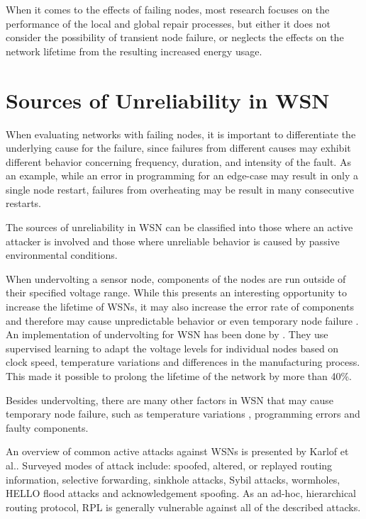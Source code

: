 When it comes to the effects of failing nodes, most research focuses on the performance of the local and global repair processes, but either it does not consider the possibility of transient node failure, or neglects the effects on the network lifetime from the resulting increased energy usage.

\section{Sources of Unreliability in WSN}

When evaluating networks with failing nodes, it is important to differentiate
the underlying cause for the failure, since failures from different causes may
exhibit different behavior concerning frequency, duration, and intensity of the
fault. As an example, while an error in programming for an edge-case may result
in only a single node restart, failures from overheating may be result in many
consecutive restarts. \cite{boano2013hot,boano2010impact}

The sources of unreliability in \ac{WSN} can be classified into those where an active attacker is involved and those where unreliable behavior is caused by passive environmental conditions.

When undervolting a sensor node, components of the nodes are run outside of their specified voltage range.
While this presents an interesting opportunity to increase the lifetime of \acp{WSN}, it may also increase the error rate of components and therefore may cause unpredictable behavior or even temporary node failure \cite{kulau2015undervolting}.
An implementation of undervolting for \ac{WSN} has been done by \cite{kulau2016idealvolting}.
They use supervised learning to adapt the voltage levels for individual nodes based on clock speed, temperature variations and differences in the manufacturing process.
This made it possible to prolong the lifetime of the network by more than 40\%.

Besides undervolting, there are many other factors in \ac{WSN} that may cause temporary node failure, such as temperature variations \cite{boano2010impact,boano2013hot,reynolds1974thermally}, programming errors and faulty components.

An overview of common active attacks against \acp{WSN} is presented by Karlof et
al.\cite{karlof2003secure}.
Surveyed modes of attack include: spoofed, altered, or replayed routing information, selective forwarding, sinkhole attacks, Sybil attacks, wormholes, HELLO flood attacks and acknowledgement spoofing.
As an ad-hoc, hierarchical routing protocol, \ac{RPL} is generally vulnerable against all of the described attacks.

